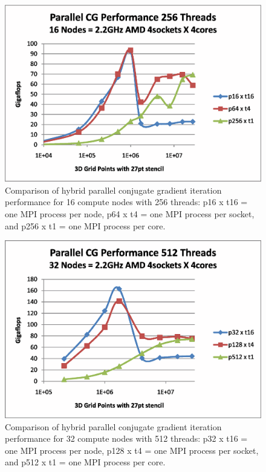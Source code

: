 \begin{figure}[h]
\center
\includegraphics[viewport=1in 0.5in 8.5in 6.5in,angle=0,scale=0.5]{test-hhpccg-intel-11.1-mpi.exe.np16.no-overlap.2.eps}
\caption{Comparison of hybrid parallel conjugate gradient iteration performance for 16 compute nodes with 256 threads: p16 x t16 = one MPI process per node, p64 x t4 = one MPI process per socket, and p256 x t1 = one MPI process per core.}
\label{fig:CGPerf:np16}
\end{figure}

\begin{figure}[h]
\center
\includegraphics[viewport=1in 0.5in 8.5in 6.5in,angle=0,scale=0.5]{test-hhpccg-intel-11.1-mpi.exe.np32.no-overlap.eps}
\caption{Comparison of hybrid parallel conjugate gradient iteration performance for 32 compute nodes with 512 threads: p32 x t16 = one MPI process per node, p128 x t4 = one MPI process per socket, and p512 x t1 = one MPI process per core.}
\label{fig:CGPerf:np32}
\end{figure}


